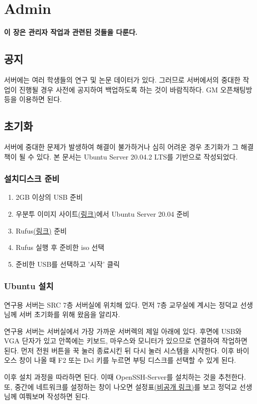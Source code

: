 \graphicspath{{./chap6/images/}}  
\chapter{Admin}
\textbf{이 장은 관리자 작업과 관련된 것들을 다룬다.}

\section{공지}
서버에는 여러 학생들의 연구 및 논문 데이터가 있다. 그러므로 서버에서의 중대한 작업이 진행될 경우 사전에 공지하여 백업하도록 하는 것이 바람직하다. GM 오픈채팅방 등을 이용하면 된다.
\section{초기화}
서버에 중대한 문제가 발생하여 해결이 불가하거나 심히 어려운 경우 초기화가 그 해결책이 될 수 있다. 본 문서는 Ubuntu Server 20.04.2 LTS를 기반으로 작성되었다.
\subsection{설치디스크 준비}
\begin{enumerate}
    \item 2GB 이상의 USB 준비
    \item 우분투 이미지 사이트\href{https://releases.ubuntu.com/20.04/}{(링크)}에서 Ubuntu Server 20.04 준비
    \item Rufus\href{https://rufus.ie/}{(링크)} 준비
    \item Rufus 실행 후 준비한 iso 선택
    \item 준비한 USB를 선택하고 '시작' 클릭
\end{enumerate}
\subsection{Ubuntu 설치}
연구용 서버는 SRC 7층 서버실에 위치해 있다. 먼저 7층 교무실에 계시는 정덕교 선생님께 서버 초기화를 위해 왔음을 알리자.

연구용 서버는 서버실에서 가장 가까운 서버렉의 제일 아래에 있다. 후면에 USB와 VGA 단자가 있고 안쪽에는 키보드, 마우스와 모니터가 있으므로 연결하여 작업하면 된다. 먼저 전원 버튼을 꾹 눌러 종료시킨 뒤 다시 눌러 시스템을 시작한다. 이후 바이오스 창이 나올 때 F2 또는 Del 키를 누르면 부팅 디스크를 선택할 수 있게 된다.

이후 설치 과정을 따라하면 된다. 이때 OpenSSH-Server를 설치하는 것을 추천한다. 또, 중간에 네트워크를 설정하는 창이 나오면 설정표\href{https://github.com/gshslinuxintro/Server-Configuration/blob/main/Network.md}{(비공개 링크)}를 보고 정덕교 선생님께 여쭤보며 작성하면 된다.
